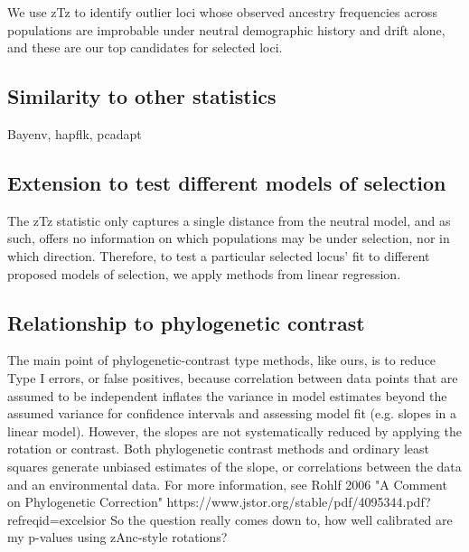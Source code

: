 \documentclass[12pt]{report}
\begin{document}
We use zTz to identify outlier loci whose observed ancestry frequencies across populations are improbable under neutral demographic history and drift alone, and these are our top candidates for selected loci. 

\subsection{Similarity to other statistics}
Bayenv, hapflk, pcadapt

\subsection{Extension to test different models of selection}

The zTz statistic only captures a single distance from the neutral model, and as such, offers no information on which populations may be under selection, nor in which direction. Therefore, to test a particular selected locus' fit to different proposed models of selection, we apply methods from linear regression. 



\subsection{Relationship to phylogenetic contrast}
The main point of phylogenetic-contrast type methods, like ours, is to reduce Type I errors, or false positives, because correlation between data points that are assumed to be independent inflates the variance in model estimates beyond the assumed variance for confidence intervals and assessing model fit (e.g. slopes in a linear model). However, the slopes are not systematically reduced by applying the rotation or contrast. Both phylogenetic contrast methods and ordinary least squares generate unbiased estimates of the slope, or correlations between the data and an environmental data. For more information, see Rohlf 2006 "A Comment on Phylogenetic Correction" https://www.jstor.org/stable/pdf/4095344.pdf?refreqid=excelsior%
So the question really comes down to, how well calibrated are my p-values using zAnc-style rotations?
\end{document}
